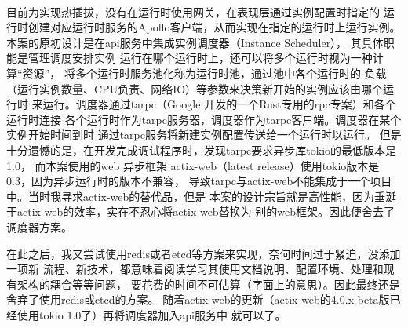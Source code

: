 \begin{keturon}
    \paragraph{} 目前为实现热插拔，没有在运行时使用网关，在表现层通过实例配置时指定的
    运行时创建对应运行时服务的Apollo客户端，从而实现在指定的运行时上运行实例。
    本案的原初设计是在api服务中集成实例调度器（Instance Scheduler），
    其具体职能是管理调度安排实例
    运行在哪个运行时上，还可以将多个运行时视为一种计算“资源”，
    将多个运行时服务池化称为运行时池，通过池中各个运行时的
    负载（运行实例数量、CPU负责、网络IO）等参数来决策新开始的实例应该由哪个运行时
    来运行。调度器通过tarpc（Google 开发的一个Rust专用的rpc专案）和各个运行时连接
    各个运行时作为tarpc服务器，调度器作为tarpc客户端。调度器在某个实例开始时间到时
    通过tarpc服务将新建实例配置传送给一个运行时以运行。
    但是十分遗憾的是，在开发完成调试程序时，发现tarpc要求异步库tokio的最低版本是1.0，
    而本案使用的web 异步框架
    actix-web（latest release）使用tokio版本是0.3，因为异步运行时的版本不兼容，
    导致tarpc与actix-web不能集成于一个项目中。当时我寻求actix-web的替代品，但是
    本案的设计宗旨就是高性能，因为垂涎于actix-web的效率，实在不忍心将actix-web替换为
    别的web框架。因此便舍去了调度器方案。

    在此之后，我又尝试使用redis或者etcd等方案来实现，奈何时间过于紧迫，没添加一项新
    流程、新技术，都意味着阅读学习其使用文档说明、配置环境、处理和现有架构的耦合等等问题，
    要花费的时间不可估算（字面上的意思）。因此最终还是舍弃了使用redis或etcd的方案。
    随着actix-web的更新（actix-web的4.0.x beta版已经使用tokio 1.0了）再将调度器加入api服务中
    就可以了。

\end{keturon}